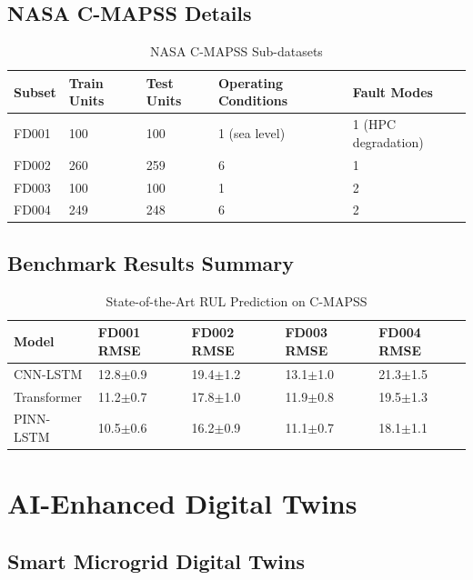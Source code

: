 \documentclass[12pt,a4paper]{article}
\begin{document}
\subsection{NASA C-MAPSS Details}

\begin{table}[H]
\centering
\caption{NASA C-MAPSS Sub-datasets}
\begin{tabular}{lllll}
\toprule
\textbf{Subset} & \textbf{Train Units} & \textbf{Test Units} & \textbf{Operating Conditions} & \textbf{Fault Modes} \\
\midrule
FD001 & 100 & 100 & 1 (sea level) & 1 (HPC degradation) \\
FD002 & 260 & 259 & 6 & 1 \\
FD003 & 100 & 100 & 1 & 2 \\
FD004 & 249 & 248 & 6 & 2 \\
\bottomrule
\end{tabular}
\end{table}

\subsection{Benchmark Results Summary}

\begin{table}[H]
\centering
\caption{State-of-the-Art RUL Prediction on C-MAPSS}
\begin{tabular}{lllll}
\toprule
\textbf{Model} & \textbf{FD001 RMSE} & \textbf{FD002 RMSE} & \textbf{FD003 RMSE} & \textbf{FD004 RMSE} \\
\midrule
CNN-LSTM & 12.8$\pm$0.9 & 19.4$\pm$1.2 & 13.1$\pm$1.0 & 21.3$\pm$1.5 \\
Transformer & 11.2$\pm$0.7 & 17.8$\pm$1.0 & 11.9$\pm$0.8 & 19.5$\pm$1.3 \\
PINN-LSTM & 10.5$\pm$0.6 & 16.2$\pm$0.9 & 11.1$\pm$0.7 & 18.1$\pm$1.1 \\
\bottomrule
\end{tabular}
\end{table}

\section{AI-Enhanced Digital Twins}

\subsection{Smart Microgrid Digital Twins}
\end{document}
